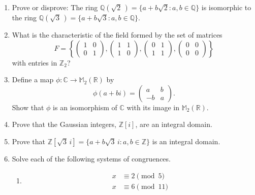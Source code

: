 {\begin{enumerate}
 
\item
Prove or disprove: The ring ${\mathbb Q}( \sqrt{2}\, ) = \{ a + b \sqrt{2}
: a, b \in {\mathbb Q} \}$ is isomorphic to the ring ${\mathbb Q}( \sqrt{3}\,
) = \{a + b \sqrt{3} : a, b \in {\mathbb Q}  \}$.
 
 
\item
What is the characteristic of the field formed by the set of matrices
\[
F
=
\left\{
\begin{pmatrix}
1 & 0 \\
0 & 1
\end{pmatrix},
\begin{pmatrix}
1 & 1 \\
1 & 0
\end{pmatrix},
\begin{pmatrix}
0 & 1 \\
1 & 1
\end{pmatrix},
\begin{pmatrix}
0 & 0 \\
0 & 0
\end{pmatrix}
\right\}
\]
with entries in ${\mathbb Z}_2$?
 
 
\item
Define a map $\phi : {\mathbb C} \rightarrow {\mathbb M}_2 ({\mathbb R})$ by
\[
\phi( a + bi) =
\begin{pmatrix}
a & b \\
-b & a
\end{pmatrix}.
\]
Show that $\phi$ is an isomorphism of ${\mathbb C}$ with its image in
${\mathbb M}_2 ({\mathbb R})$.
 
 
 
\item
Prove that the Gaussian integers, ${\mathbb Z}[i ]$, are an integral
domain. 
 
 
 
\item\label{rings:gaussian_exercise}
Prove that  ${\mathbb Z}[ \sqrt{3}\, i ] = \{ a + b \sqrt{3}\, i : a, b \in
{\mathbb Z} \}$ is an integral domain.
 
 
\item
Solve each of the following systems of congruences.
\begin{multicols}{2}
\begin{enumerate}

\item
\begin{align*}
x & \equiv  2 \pmod{5} \\
x & \equiv  6 \pmod{11}
\end{align*}


\end{enumerate}
\end{multicols}
\end{enumerate}}
